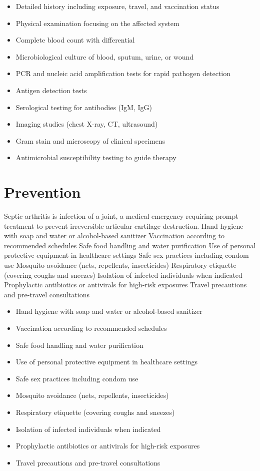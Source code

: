 \begin{itemize}[noitemsep]
  \item Detailed history including exposure, travel, and vaccination status
  \item Physical examination focusing on the affected system
  \item Complete blood count with differential
  \item Microbiological culture of blood, sputum, urine, or wound
  \item PCR and nucleic acid amplification tests for rapid pathogen detection
  \item Antigen detection tests
  \item Serological testing for antibodies (IgM, IgG)
  \item Imaging studies (chest X-ray, CT, ultrasound)
  \item Gram stain and microscopy of clinical specimens
  \item Antimicrobial susceptibility testing to guide therapy
\end{itemize}
\section{Prevention}
Septic arthritis is infection of a joint, a medical emergency requiring prompt treatment to prevent irreversible articular cartilage destruction. Hand hygiene with soap and water or alcohol-based sanitizer Vaccination according to recommended schedules Safe food handling and water purification Use of personal protective equipment in healthcare settings Safe sex practices including condom use Mosquito avoidance (nets, repellents, insecticides) Respiratory etiquette (covering coughs and sneezes) Isolation of infected individuals when indicated Prophylactic antibiotics or antivirals for high-risk exposures Travel precautions and pre-travel consultations

\begin{itemize}[noitemsep]
  \item Hand hygiene with soap and water or alcohol-based sanitizer
  \item Vaccination according to recommended schedules
  \item Safe food handling and water purification
  \item Use of personal protective equipment in healthcare settings
  \item Safe sex practices including condom use
  \item Mosquito avoidance (nets, repellents, insecticides)
  \item Respiratory etiquette (covering coughs and sneezes)
  \item Isolation of infected individuals when indicated
  \item Prophylactic antibiotics or antivirals for high-risk exposures
  \item Travel precautions and pre-travel consultations
\end{itemize}
